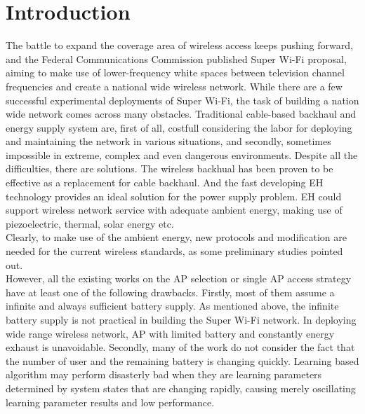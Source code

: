 \documentclass[conference]{IEEEtran}
\begin{document}
\section{Introduction}
The battle to expand the coverage area of wireless access keeps pushing forward, 
and the Federal Communications Commission published Super Wi-Fi proposal, 
aiming to make use of lower-frequency white spaces between television channel frequencies 
and create a national wide wireless network. 
While there are a few successful experimental deployments of Super Wi-Fi, 
the task of building a nation wide network comes across many obstacles.
Traditional cable-based backhaul and energy supply system are, first of all, 
costfull considering the labor for deploying and maintaining the network in various situations, 
and secondly, sometimes impossible in extreme, complex and even dangerous environments.
Despite all the difficulties, there are solutions. 
The wireless backhual has been proven to be effective \cite{} as a replacement for cable backhaul.
And the fast developing EH technology provides an ideal solution for the power supply problem.
EH could support wireless network service with adequate ambient energy,
making use of piezoelectric, thermal, solar energy etc.\\
Clearly, to make use of the ambient energy, new protocols and modification are needed for the current wireless standards,
as some preliminary studies pointed out.\cite{}\\
However, all the existing works on the AP selection or single AP access strategy 
have at least one of the following drawbacks.
Firstly, most of them assume a infinite and always sufficient battery supply. 
As mentioned above, the infinite battery supply is not practical in building the Super Wi-Fi network.
In deploying wide range wireless network, AP with limited battery and constantly energy exhaust is unavoidable.
Secondly, many of the work do not consider the fact that the number of user and the remaining battery is changing quickly.
Learning based algorithm may perform disasterly bad when they are learning parameters determined by system states that 
are changing rapidly, causing merely oscillating learning parameter results and low performance. 
\end{document}
